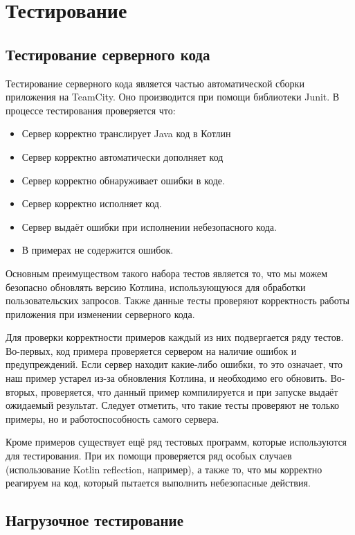 \chapter{Тестирование}
\section{Тестирование серверного кода}
	Тестирование серверного кода является частью автоматической сборки приложения на TeamCity. Оно производится при помощи библиотеки Junit. В процессе тестирования проверяется что:
\begin{itemize}
\item Сервер корректно транслирует Java код в Котлин
\item Сервер корректно автоматически дополняет код
\item Сервер корректно обнаруживает ошибки в коде.
\item Сервер корректно исполняет код.
\item Сервер выдаёт ошибки при исполнении небезопасного кода.
\item В примерах не содержится ошибок. 
\end{itemize}
	
	Основным преимуществом такого набора тестов является то, что мы можем безопасно обновлять версию Котлина, использующуюся для обработки пользовательских запросов. Также данные тесты проверяют корректность работы приложения при изменении серверного кода.
	
	Для проверки корректности примеров каждый из них подвергается ряду тестов. Во-первых, код примера проверяется сервером на наличие ошибок и предупреждений. Если сервер находит какие-либо ошибки, то это означает, что наш пример устарел из-за обновления Котлина, и необходимо его обновить. Во-вторых, проверяется, что данный пример компилируется и при запуске выдаёт ожидаемый результат. Следует отметить, что такие тесты проверяют не только примеры, но и работоспособность самого сервера. 
	
	Кроме примеров существует ещё ряд тестовых программ, которые  используются для тестирования. При их помощи проверяется ряд особых случаев (использование Kotlin reflection, например), а также то, что мы корректно реагируем на код, который пытается выполнить небезопасные действия.
	
\section{Нагрузочное тестирование}

